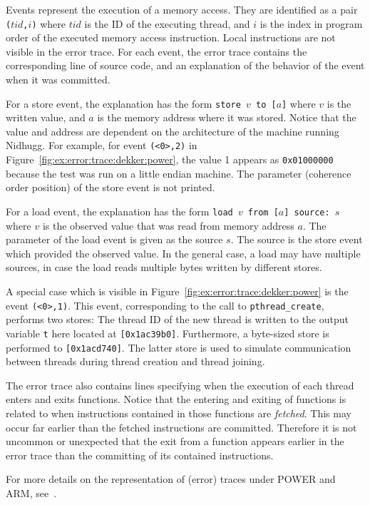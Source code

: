 \documentclass[a4paper]{article}
\begin{document}
\noindent
Events represent the execution of a memory access. They are identified
as a pair \texttt{($tid$,$i$)} where $tid$ is the ID of the executing
thread, and $i$ is the index in program order of the executed memory
access instruction. Local instructions are not visible in the error
trace. For each event, the error trace contains the corresponding line
of source code, and an explanation of the behavior of the event when
it was committed.

For a store event, the explanation has the form
\texttt{store~$v$~to~[$a$]} where $v$ is the written value, and $a$ is
the memory address where it was stored. Notice that the value and
address are dependent on the architecture of the machine running
Nidhugg. For example, for event \texttt{(<0>,2)} in
Figure~\ref{fig:ex:error:trace:dekker:power}, the value 1 appears as
\texttt{0x01000000} because the test was run on a little endian
machine. The parameter (coherence order position) of the store event
is not printed.

For a load event, the explanation has the form
\texttt{load~$v$~from~[$a$]~source:~$s$} where $v$ is the observed
value that was read from memory address $a$. The parameter of the load
event is given as the source $s$. The source is the store event which
provided the observed value. In the general case, a load may have
multiple sources, in case the load reads multiple bytes written by
different stores.

A special case which is visible in
Figure~\ref{fig:ex:error:trace:dekker:power} is the event
\texttt{(<0>,1)}. This event, corresponding to the call to
\texttt{pthread\_create}, performs two stores: The thread ID of the
new thread is written to the output variable \texttt{t} here located
at \texttt{[0x1ac39b0]}. Furthermore, a byte-sized store is performed
to \texttt{[0x1acd740]}. The latter store is used to simulate
communication between threads during thread creation and thread
joining.

The error trace also contains lines specifying when the execution of
each thread enters and exits functions. Notice that the entering and
exiting of functions is related to when instructions contained in
those functions are \emph{fetched}. This may occur far earlier than
the fetched instructions are committed. Therefore it is not uncommon
or unexpected that the exit from a function appears earlier in the
error trace than the committing of its contained instructions.

For more details on the representation of (error) traces under POWER
and ARM, see~\cite{leonardssonRSMCPOWER}.
\end{document}
